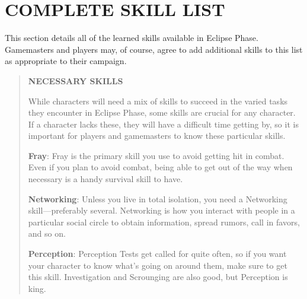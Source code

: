 \section{COMPLETE SKILL LIST} 





This section details all of the learned skills available in Eclipse Phase. Gamemasters and players may, of course, agree to add additional skills to this list as appropriate to their campaign. 

\begin{quotation} \textbf{NECESSARY SKILLS} 

While characters will need a mix of skills to succeed in the varied tasks they encounter in Eclipse Phase, some skills are crucial for any character. If a character lacks these, they will have a difficult time getting by, so it is important for players and gamemasters to know these particular skills. 

\textbf{Fray}: Fray is the primary skill you use to avoid getting hit in combat. Even if you plan to avoid combat, being able to get out of the way when necessary is a handy survival skill to have. 

\textbf{Networking}: Unless you live in total isolation, you need a Networking skill—preferably several. Networking is how you interact with people in a particular social circle to obtain information, spread rumors, call in favors, and so on. 

\textbf{Perception}: Perception Tests get called for quite often, so if you want your character to know what’s going on around them, make sure to get this skill. Investigation and Scrounging are also good, but Perception is king. \end{quotation} 




